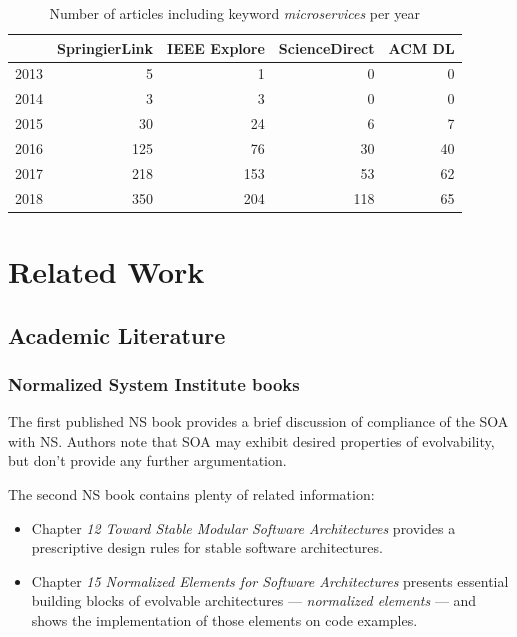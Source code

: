 \documentclass[thesis=M,english,hidelinks]{FITthesis}[2012/10/20]
\begin{document}
\begin{table}[b]
\centering
\caption{Number of articles including keyword \textit{microservices} per year}
\label{tab:ms_trends}
\begin{tabular}{r|r|r|r|r}
              & \textbf{SpringierLink}  & \textbf{IEEE Explore} & \textbf{ScienceDirect} & \textbf{ACM DL}                \\ 
\hline
2013 & 5                       &  1                    & 0                       & 0                             \\ 
\hline
2014 & 3                       &  3                    & 0                       & 0                             \\ 
\hline
2015 & 30                      & 24                    & 6                       & 7                             \\ 
\hline
2016 & 125                     & 76                    & 30                      & 40                            \\ 
\hline
2017 & 218                     & 153                   & 53                      & 62                            \\ 
\hline
2018 & 350                     & 204                   & 118                     & 65                           
\end{tabular}
\end{table}

% 
% 
\section{Related Work}
\label{sec:related_work}
\subsection{Academic Literature}
\subsubsection*{Normalized System Institute books}
The first published \acrshort{NS} book \cite{ns-recreating} provides a brief discussion of compliance of the \acrfull{SOA} with \acrshort{NS}. Authors note that \acrshort{SOA} may exhibit desired properties of evolvability, but don't provide any further argumentation.

The second \acrshort{NS} book \cite{ns-toward-general-theory} contains plenty of related information:
\begin{itemize}
    \item Chapter \textit{12 Toward Stable Modular Software Architectures} provides a prescriptive design rules for stable software architectures.
    \item Chapter \textit{15 Normalized Elements for Software Architectures} presents essential building blocks of evolvable architectures --- \textit{normalized elements} --- and shows the implementation of those elements on code examples.
\end{itemize}
\end{document}
